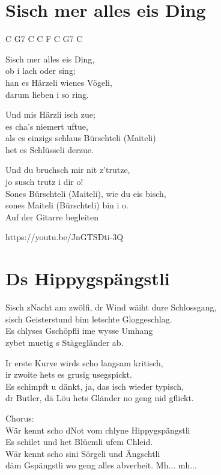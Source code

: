 \documentclass[
  letterpaper,
]{scrbook}
\begin{document}
\hypertarget{sisch-mer-alles-eis-ding}{%
\chapter{S\textquotesingle isch mer alles eis
Ding}\label{sisch-mer-alles-eis-ding}}

C G7 C C F C G7 C

S\textquotesingle isch mer alles eis Ding,\\
ob i lach oder sing;\\
han es Härzeli wienes Vögeli,\\
darum lieben i so ring.

Und mis Härzli isch zue;\\
es cha's niemert uftue,\\
als es einzigs schlaus Bürschteli (Maiteli)\\
het es Schlüsseli derzue.

Und du bruchsch mir nit z'trutze,\\
jo susch trutz i dir o!\\
Sones Bürschteli (Maiteli), wie du eis bisch,\\
sones Maiteli (Bürschteli) bin i o.\\
Auf der Gitarre begleiten

https://youtu.be/JnGTSDti-3Q

\hypertarget{ds-hippygspuxe4ngstli}{%
\chapter{Ds Hippygspängstli}\label{ds-hippygspuxe4ngstli}}

S\textquotesingle isch z\textquotesingle Nacht am zwölfi, dr Wind wäiht
dure Schlossgang,\\
s\textquotesingle isch Geisterstund bim letschte Gloggeschlag.\\
Es chlyses Gschöpfli ime wysse Umhang\\
zybet muetig s Stägegländer ab.

Ir erste Kurve wird\textquotesingle s scho langsam kritisch,\\
ir zwoite hets es grusig usegspickt.\\
Es schimpft u dänkt, ja, das isch wieder typisch,\\
dr Butler, dä Löu het\textquotesingle s Gländer no geng nid gflickt.

Chorus:\\
Wär kennt scho d\textquotesingle Not vom chlyne Hippygspängstli\\
Es schilet und het Blüemli ufem Chleid.\\
Wär kennt scho sini Sörgeli und Ängschtli\\
däm Gspängstli wo geng alles abverheit. Mh... mh...
\end{document}
